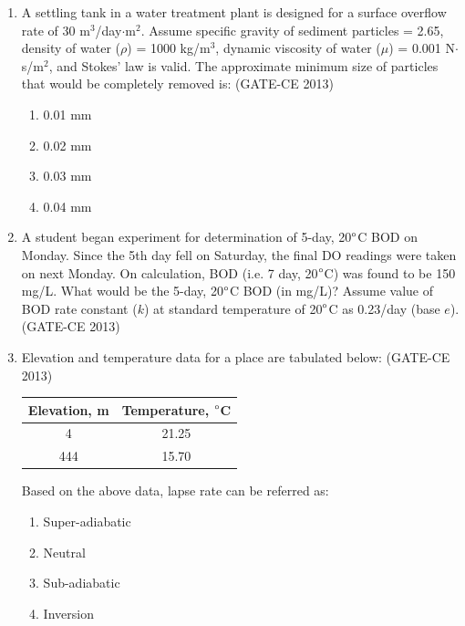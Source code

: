 \documentclass[journal,12pt,onecolumn]{article}
\theoremstyle{remark}
\begin{document}
\begin{enumerate}
    \item A settling tank in a water treatment plant is designed for a surface overflow rate of 30 m$^3$/day$\cdot$m$^2$. Assume specific gravity of sediment particles = 2.65, density of water ($\rho$) = 1000 kg/m$^3$, dynamic viscosity of water ($\mu$) = 0.001 N$\cdot$s/m$^2$, and Stokes' law is valid. The approximate minimum size of particles that would be completely removed is: (GATE-CE 2013)
    \begin{multicols}{4}
    \begin{enumerate}
        \item 0.01 mm 
        \item 0.02 mm 
        \item 0.03 mm 
        \item 0.04 mm
    \end{enumerate}
    \end{multicols}
    
    \item A student began experiment for determination of 5-day, 20$\degree$C BOD on Monday. Since the 5th day fell on Saturday, the final DO readings were taken on next Monday. On calculation, BOD (i.e. 7 day, 20$\degree$C) was found to be 150 mg/L. What would be the 5-day, 20$\degree$C BOD (in mg/L)? Assume value of BOD rate constant ($k$) at standard temperature of 20$\degree$C as 0.23/day (base $e$). \underline{\hspace{3cm}} (GATE-CE 2013)
    
    \item Elevation and temperature data for a place are tabulated below: (GATE-CE 2013)
    
    \begin{table}[H]
    \centering
    \begin{tabular}{|c|c|}
    \hline
    Elevation, m & Temperature, $\degree$C \\
    \hline
    4 & 21.25 \\
    444 & 15.70 \\
    \hline
    \end{tabular}
    \end{table}
    
    
    Based on the above data, lapse rate can be referred as:
    \begin{multicols}{2}
    \begin{enumerate}
        \item Super-adiabatic 
        \item Neutral 
        \item Sub-adiabatic 
        \item Inversion
    \end{enumerate}
    \end{multicols}
    

\end{enumerate}
\end{document}
